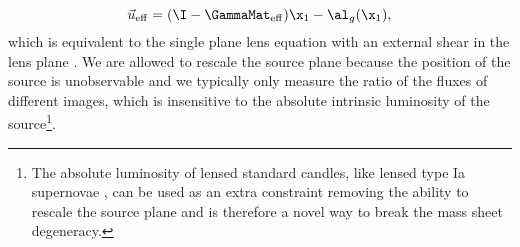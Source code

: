 \begin{equation}
\vec{u}_{\rm eff} = (\I - \GammaMat_{\rm eff}) \x_1 - \al_g(\x_1),
\end{equation}
which is equivalent to the single plane lens equation with an external shear in the lens plane \citep[see also ][]{Schneider97}. We are allowed to rescale the source plane because the position of the source is unobservable and we typically only measure the ratio of the fluxes of different images, which is insensitive to the absolute intrinsic luminosity of the source\footnote{The absolute luminosity of lensed standard candles, like lensed type Ia supernovae \citep{Kelly15, Patel14, Kolatt98}, can be used as an extra constraint removing the ability to rescale the source plane and is therefore a novel way to break the mass sheet degeneracy.}.
  
  
  